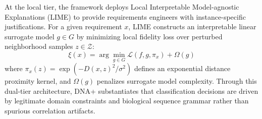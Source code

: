 At the local tier, the framework deploys Local Interpretable Model-agnostic Explanations (LIME) to provide requirements engineers with instance-specific justifications. For a given requirement $x$, LIME constructs an interpretable linear surrogate model $g \in G$ by minimizing local fidelity loss over perturbed neighborhood samples $z \in \mathcal{Z}$:
\begin{equation}
\xi(x) = \arg\min_{g \in G} \mathcal{L}(f, g, \pi_x) + \Omega(g)
\end{equation}
where $\pi_x(z) = \exp(-D(x, z)^2 / \sigma^2)$ defines an exponential distance proximity kernel, and $\Omega(g)$ penalizes surrogate model complexity. Through this dual-tier architecture, DNA+ substantiates that classification decisions are driven by legitimate domain constraints and biological sequence grammar rather than spurious correlation artifacts.